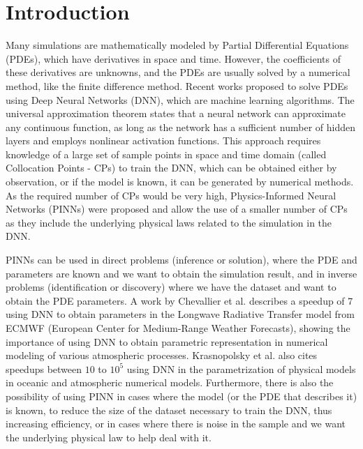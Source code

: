 \documentclass[conference]{IEEEtran}
\begin{document}

\section{Introduction}

Many simulations are mathematically modeled by Partial Differential Equations (PDEs), which have derivatives in space and time. However, the coefficients of these derivatives are unknowns, and the PDEs are usually solved by a numerical method, like the finite difference method. Recent works proposed to solve PDEs using Deep Neural Networks (DNN), which are machine learning algorithms. The universal approximation theorem states that a neural network can approximate any continuous function, as long as the network has a sufficient number of hidden layers and employs nonlinear activation functions.
This approach requires knowledge of a large set of sample points in space and time domain (called Collocation Points - CPs) to train the DNN, which can be obtained either by observation, or if the model is known, it can be generated by numerical methods. 
As the required number of CPs would be very high, Physics-Informed Neural Networks (PINNs) were proposed and allow the use of a smaller number of CPs as they include the underlying physical laws related to the simulation in the DNN.   


PINNs can be used in direct problems (inference or solution), where the PDE and parameters are known and we want to obtain the simulation result, and in inverse problems (identification or discovery) where we have the dataset and want to obtain the PDE parameters.
A work by Chevallier et al. \cite{Chevallier2000} describes a speedup of 7 using DNN to obtain parameters in the Longwave Radiative Transfer model from ECMWF (European Center for Medium-Range Weather Forecasts), showing the importance of using DNN to obtain parametric representation in numerical modeling of various atmospheric processes.
Krasnopolsky et al. \cite{Krasnopolsky2006} also cites speedups between $10$ to $10^5$ using DNN in the parametrization of physical models in oceanic and atmospheric numerical models.
Furthermore, there is also the possibility of using PINN in cases where the model (or the PDE that describes it) is known, to reduce the size of the dataset necessary to train the DNN, thus increasing efficiency, or in cases where there is noise in the sample and we want the underlying physical law to help deal with it.
\end{document}
